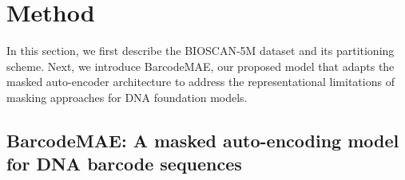 \section{Method \label{sec:method}}

In this section, we first describe the BIOSCAN-5M dataset and its partitioning scheme. Next, we introduce BarcodeMAE, our proposed model that adapts the masked auto-encoder architecture to address the representational limitations of masking approaches for DNA foundation models.



%

\subsection{BarcodeMAE: A masked auto-encoding model for DNA barcode sequences\label{sec:mask_strategies}}



